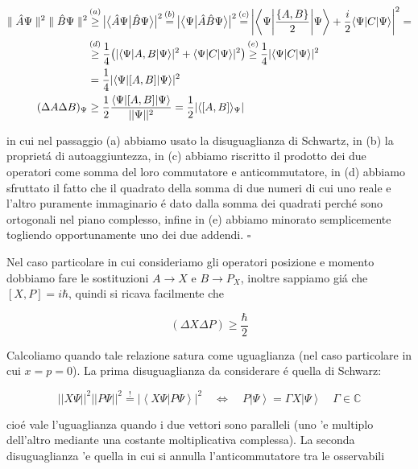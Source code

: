 \begin{enumerate}
\begin{align*}
	\parallel\hat{A}\Psi\parallel^2 \; \parallel\hat{B}\Psi\parallel^2  
	&\overbracket[0pt][0pt]{\geq}^{(a)}
	\big| \braket[\big]{\hat{A}\Psi}{\hat{B}\Psi} \big|^2 \overbracket[0pt][0pt]{=}^{(b)} \big| \braket[\big]{\Psi}{\hat{A}\hat{B}\Psi} \big|^2 
	\overbracket[0pt][0pt]{=}^{(c)} \bigg| \bra[\bigg]{\Psi} \frac{\{A, B\}}{2} \ket[\bigg]{\Psi} + \frac{i}{2} \bra{\Psi} C \ket{\Psi} \bigg|^2 =
	\\
	&\overbracket[0pt][0pt]{\geq}^{(d)} \frac{1}{4} \big( | \bra{\Psi}{A, B}\ket{\Psi} |^2 + \bra{\Psi} C \ket{\Psi} |^2 \big) \overbracket[0pt][0pt]{\geq}^{(e)} \frac{1}{4} | \bra{\Psi} C \ket{\Psi} |^2 
	\\
	&= \frac{1}{4} | \bra{\Psi} [A, B] \ket{\Psi} |^2 
	\\
	(\Delta A \Delta B)_\Psi 
	&\geq \frac{1}{2} \frac{\bra{\Psi} [A, B] \ket{\Psi}} {||\Psi||^2} = \frac{ 1}{ 2 } | \langle [A, B] \rangle_\Psi |
\end{align*}

in cui nel passaggio (a) abbiamo usato la disuguaglianza di Schwartz, in (b) la propriet\'a di autoaggiuntezza, in	(c) abbiamo riscritto il prodotto dei due operatori come somma del loro commutatore e anticommutatore, in (d) abbiamo sfruttato il fatto che il quadrato della somma di due numeri di cui uno reale e l'altro puramente immaginario \'e dato dalla somma dei quadrati perch\'e sono ortogonali nel piano complesso, infine in (e) abbiamo minorato semplicemente togliendo opportunamente uno dei due addendi. $\square$
	
Nel caso particolare in cui consideriamo gli operatori posizione e momento dobbiamo fare le sostituzioni $A \to X$ e $B \to P_X$, inoltre sappiamo gi\'a che $[X, P] = i\hbar$, quindi si ricava facilmente che
	
$$(\Delta X\Delta P)\geq{\frac{\hbar}{2}}$$
	
Calcoliamo quando tale relazione satura come uguaglianza (nel caso particolare in cui $x = p = 0$). La prima disuguaglianza da considerare \'e quella di Schwarz:
	
$$||X\Psi||^{2}||P\Psi||^{2}\stackrel{{!}}{{=}}|\left\langle X\Psi|P\Psi\right\rangle|^{2}\quad\Longleftrightarrow\quad P\left|\Psi\right\rangle=\Gamma X\left|\Psi\right\rangle\quad\Gamma\in\mathbb{C}$$

cio\'e vale l'uguaglianza quando i due vettori sono paralleli (uno 'e multiplo dell'altro mediante una costante moltiplicativa complessa). La seconda disuguaglianza 'e quella in cui si annulla l'anticommutatore tra le osservabili
	

\end{enumerate}
